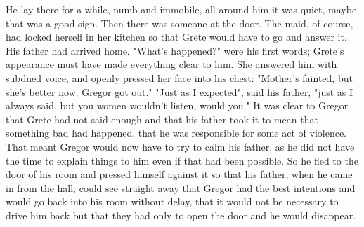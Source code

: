 He lay there for a while, numb and immobile, all around him it was quiet, maybe that was a good sign. Then there was someone at the door. The maid, of course, had locked herself in her kitchen so that Grete would have to go and answer it. His father had arrived home. "What's happened?" were his first words; Grete's appearance must have made everything clear to him. She answered him with subdued voice, and openly pressed her face into his chest: "Mother's fainted, but she's better now. Gregor got out." "Just as I expected", said his father, "just as I always said, but you women wouldn't listen, would you." It was clear to Gregor that Grete had not said enough and that his father took it to mean that something bad had happened, that he was responsible for some act of violence. That meant Gregor would now have to try to calm his father, as he did not have the time to explain things to him even if that had been possible. So he fled to the door of his room and pressed himself against it so that his father, when he came in from the hall, could see straight away that Gregor had the best intentions and would go back into his room without delay, that it would not be necessary to drive him back but that they had only to open the door and he would disappear.

